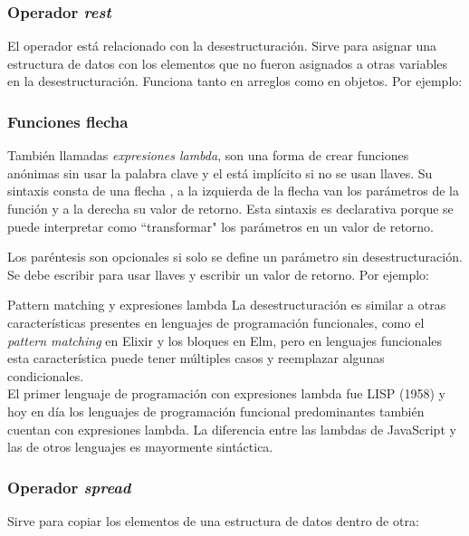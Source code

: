 \documentclass{article}
\newcommand{\code}[1]{\tcbox{\texttt{#1}}}
\newcommand{\codejs}[1]{\tcbox{\lstinline[style=ES6]{#1}}}
\newcommand{\jsfile}[2]{}
\newenvironment{info}[1]
  {\begin{bclogo}[logo=\bcinfo, couleurBarre=orange, noborder=true, couleur=white]{#1}}
  {\end{bclogo}}
\begin{document}
\subsubsection{Operador \textit{rest} \codejs{...}}
El operador \codejs{...} está relacionado con la desestructuración. Sirve para asignar una estructura de datos con los elementos que no fueron asignados a otras variables en la desestructuración. Funciona tanto en arreglos como en objetos. Por ejemplo:
\jsfile{Ejemplo del operador rest}{code/destructing/rest.js}

\subsubsection{Funciones flecha \codejs{=>}}
También llamadas \textit{expresiones lambda}, son una forma de crear funciones anónimas sin usar la palabra clave \codejs{function} y el \codejs{return} está implícito si no se usan llaves. Su sintaxis consta de una flecha \codejs{=>}, a la izquierda de la flecha van los parámetros de la función y a la derecha su valor de retorno. Esta sintaxis es declarativa porque se puede interpretar como ``transformar" \medspace los parámetros en un valor de retorno.

Los paréntesis son opcionales si solo se define un parámetro sin desestructuración. Se debe escribir \codejs{return} para usar llaves y escribir un valor de retorno. Por ejemplo:
\jsfile{Ejemplo de funciones flecha}{code/functions/arrow.js}

\begin{info}{Pattern matching y expresiones lambda}
  La desestructuración es similar a otras características presentes en lenguajes de programación funcionales, como el \textit{pattern matching} en Elixir\cite{elixir-pattern-match} y los bloques \code{case} en Elm\cite{elm-case}, pero en lenguajes funcionales esta característica puede tener múltiples casos y reemplazar algunas condicionales. \medskip \\
  El primer lenguaje de programación con expresiones lambda fue LISP (1958) y hoy en día los lenguajes de programación funcional predominantes también cuentan con expresiones lambda. La diferencia entre las lambdas de JavaScript y las de otros lenguajes es mayormente sintáctica.
\end{info}

\subsubsection{Operador \textit{spread} \codejs{...}}
Sirve para copiar los elementos de una estructura de datos dentro de otra:
\jsfile{Ejemplo del operador spread}{code/data-structures/spread.js}
\end{document}
